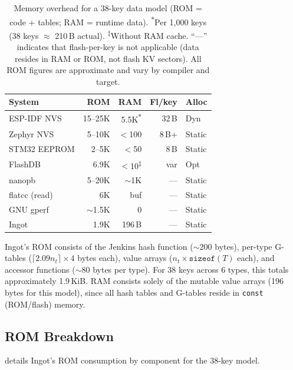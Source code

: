 \documentclass[10pt,twocolumn,letterpaper]{article}
\begin{document}
\begin{table}[t]
\centering
\footnotesize
\setlength{\tabcolsep}{3pt}
\begin{tabular}{@{}lrrrl@{}}
\toprule
\textbf{System} & \textbf{ROM} & \textbf{RAM} & \textbf{Fl/key} & \textbf{Alloc} \\
\midrule
ESP-IDF NVS & 15--25K & 5.5K\textsuperscript{$\ast$} & 32\,B & Dyn \\
Zephyr NVS & 5--10K & $<$100 & 8\,B+ & Static \\
STM32 EEPROM & 2--5K & $<$50 & 8\,B & Static \\
FlashDB & 6.9K & $<$10\textsuperscript{$\ddagger$} & var & Opt \\
nanopb & 5--20K & $\sim$1K & --- & Static \\
flatcc (read) & 6K & buf & --- & Static \\
GNU gperf & $\sim$1.5K & 0 & --- & Static \\
Ingot & 1.9K & 196\,B & --- & Static \\
\bottomrule
\end{tabular}
\caption{Memory overhead for a 38-key data model (ROM = code +
tables; RAM = runtime data).  \textsuperscript{$\ast$}Per 1,000 keys
(38 keys $\approx$ 210\,B actual).  \textsuperscript{$\ddagger$}Without
RAM cache.  ``---'' indicates that flash-per-key is not applicable
(data resides in RAM or ROM, not flash KV sectors).  All ROM figures
are approximate and vary by compiler and target.}
\label{tab:memory}
\end{table}

Ingot's ROM consists of the Jenkins hash function ($\sim$200 bytes),
per-type G-tables ($\lceil 2.09n_t \rceil \times 4$ bytes each), value
arrays ($n_t \times \texttt{sizeof}(T)$ each), and accessor functions
($\sim$80 bytes per type).  For 38 keys across 6 types, this totals
approximately 1.9\,KiB.  RAM consists solely of the mutable value
arrays (196 bytes for this model), since all hash tables and G-tables
reside in \texttt{const} (ROM/flash) memory.

\subsection{ROM Breakdown}

 details Ingot's ROM consumption by component
for the 38-key model.
\end{document}
